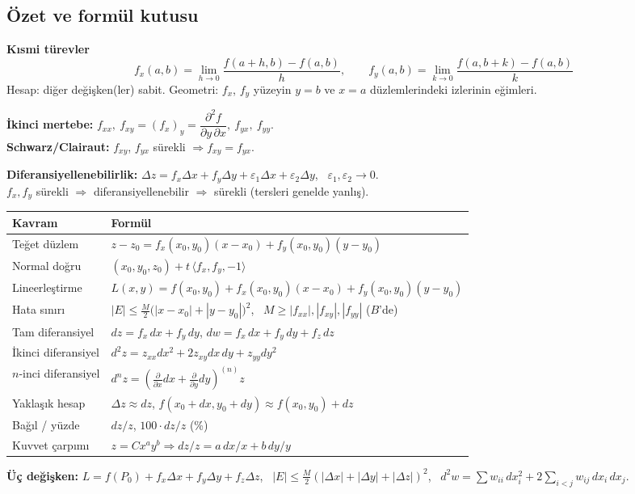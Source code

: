 \subsection{Özet ve formül kutusu}

\begin{ozet}
\textbf{Kısmi türevler}
\[
f_x(a,b)=\lim_{h\to0}\frac{f(a+h,b)-f(a,b)}{h},\qquad f_y(a,b)=\lim_{k\to0}\frac{f(a,b+k)-f(a,b)}{k}
\]
Hesap: diğer değişken(ler) sabit. Geometri: $f_x$, $f_y$ yüzeyin $y=b$ ve $x=a$ düzlemlerindeki izlerinin eğimleri.

\textbf{İkinci mertebe:} $f_{xx},\ f_{xy}=(f_x)_y=\dfrac{\partial^2f}{\partial y\,\partial x},\ f_{yx},\ f_{yy}$.\\
\textbf{Schwarz/Clairaut:} $f_{xy}$, $f_{yx}$ sürekli $\Rightarrow f_{xy}=f_{yx}$.

\textbf{Diferansiyellenebilirlik:}
$\Delta z=f_x\Delta x+f_y\Delta y+\varepsilon_1\Delta x+\varepsilon_2\Delta y$, \ $\varepsilon_1,\varepsilon_2\to0$.\\
$f_x,f_y$ sürekli $\Rightarrow$ diferansiyellenebilir $\Rightarrow$ sürekli (tersleri genelde yanlış).

\begin{center}
\begin{tabular}{l l}
\toprule
Kavram & Formül \\
\midrule
Teğet düzlem & $z-z_0=f_x(x_0,y_0)(x-x_0)+f_y(x_0,y_0)(y-y_0)$ \\
Normal doğru & $(x_0,y_0,z_0)+t\,\langle f_x,f_y,-1\rangle$ \\
Lineerleştirme & $L(x,y)=f(x_0,y_0)+f_x(x_0,y_0)(x-x_0)+f_y(x_0,y_0)(y-y_0)$ \\
Hata sınırı & $|E|\le\frac M2\big(|x-x_0|+|y-y_0|\big)^2$, \ $M\ge|f_{xx}|,|f_{xy}|,|f_{yy}|$ ($B$'de) \\
Tam diferansiyel & $dz=f_x\,dx+f_y\,dy$, \quad $dw=f_x\,dx+f_y\,dy+f_z\,dz$ \\
İkinci diferansiyel & $d^2z=z_{xx}dx^2+2z_{xy}dx\,dy+z_{yy}dy^2$ \\
$n$-inci diferansiyel & $d^nz=\left(\frac{\partial}{\partial x}dx+\frac{\partial}{\partial y}dy\right)^{(n)}z$ \\
Yaklaşık hesap & $\Delta z\approx dz$, \quad $f(x_0+dx,y_0+dy)\approx f(x_0,y_0)+dz$ \\
Bağıl / yüzde & $dz/z$, \quad $100\cdot dz/z$ (\%) \\
Kuvvet çarpımı & $z=Cx^ay^b\Rightarrow dz/z=a\,dx/x+b\,dy/y$ \\
\bottomrule
\end{tabular}
\end{center}

\textbf{Üç değişken:} $L=f(P_0)+f_x\Delta x+f_y\Delta y+f_z\Delta z$, \
$|E|\le\frac M2(|\Delta x|+|\Delta y|+|\Delta z|)^2$, \
$d^2w=\sum w_{ii}\,dx_i^2+2\sum_{i<j}w_{ij}\,dx_i\,dx_j$.
\end{ozet}

